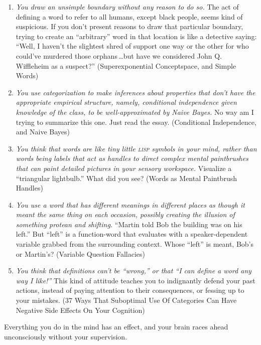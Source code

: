 {{\begin{enumerate}
\item {
 \textit{You draw an unsimple boundary without any reason to do
so.} The act of defining a word to refer to all humans, except black
people, seems kind of suspicious. If you don't present
reasons to draw that particular boundary, trying to create an
``arbitrary'' word in that location
is like a detective saying: ``Well, I
haven't the slightest shred of support one way or the
other for who could've murdered those orphans\,\ldots but
have we considered John Q. Wiffleheim as a suspect?''
(Superexponential Conceptspace, and Simple Words)}

\item {
 \textit{You use categorization to make inferences about properties
that don't have the appropriate empirical structure,
namely, conditional independence given knowledge of the class, to be
well-approximated by Naive Bayes.} No way am I trying to summarize this
one. Just read the essay. (Conditional Independence, and Naive Bayes)}

\item {
 \textit{You think that words are like tiny little \textsc{lisp} symbols in
your mind, rather than words being labels that act as handles to direct
complex mental paintbrushes that can paint detailed pictures in your
sensory workspace.} Visualize a ``triangular
lightbulb.'' What did you see? (Words as Mental
Paintbrush Handles)}

\item {
 \textit{You use a word that has different meanings in different
places as though it meant the same thing on each occasion, possibly
creating the illusion of something protean and shifting.}
``Martin told Bob the building was on his
left.'' But
``left'' is a function-word that
evaluates with a speaker-dependent variable grabbed from the
surrounding context. Whose ``left''
is meant, Bob's or Martin's? (Variable
Question Fallacies)}

\item {
 \textit{You think that definitions can't be
``wrong,'' or that
``I can define a word any way I
like!''} This kind of attitude teaches you to
indignantly defend your past actions, instead of paying attention to
their consequences, or fessing up to your mistakes. (37 Ways That
Suboptimal Use Of Categories Can Have Negative Side Effects On Your
Cognition)}
\end{enumerate}

{
 Everything you do in the mind has an effect, and your brain races
ahead unconsciously without your supervision.}

}}
